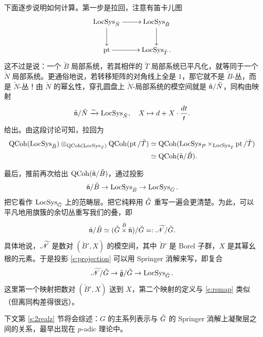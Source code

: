 	  下面逐步说明如何计算。第一步是拉回，注意有笛卡儿图
	  \[
	  \xymatrix{ \on{LocSys}_{\check{N}} \ar[r] \ar[d] &
	  \on{LocSys}_{\check{B}} \ar[d] \\ \on{pt} \ar[r] &
	  \on{LocSys}_{\check{T}}.}
	  \]
	  这不过是说：一个 $\check{B}$ 局部系统，若其相伴的 $\check{T}$ 局部系统已平凡化，就等同于一个 $\check{N}$ 局部系统。更通俗地说，若转移矩阵的对角线上全是 $1$，那它就不是 $\check{B}$-丛，而是 $\check{N}$-丛！由 $\check{N}$ 的幂幺性，穿孔圆盘上 $\check{N}$-局部系统的模空间就是 $\check{\mathfrak{n}} / \check{N}$，同构由映射
	  \begin{equation} \label{e:rsmap}
	    \check{\mathfrak{n}} / \check{N} \xrightarrow{\sim}
	    \operatorname{LocSys}_{\check{N}},
	    \quad  X \mapsto d +
	    X \cdot
	    \frac{dt}{t}.
	  \end{equation}
	 给出。由这段讨论可知，拉回为
	 \begin{equation}
	 \begin{split}
	 \operatorname{QCoh}(\operatorname{LocSys}_{\check{B}}) \otimes_{\operatorname{QCoh}(\operatorname{LocSys}_{\check{T}})}
	 \operatorname{QCoh}(\operatorname{pt}/\check{T}) &\simeq \operatorname{QCoh}( \operatorname{LocSys}_{P}  \times_{
	 \operatorname{LocSys}_{\check{T}}} \operatorname{pt}/\check{T}  ) \\
	 &\simeq \operatorname{QCoh}(\check{\mathfrak{n}} / \check{B} ).
	 \end{split}
	 \end{equation}


最后，推前再次给出 $\operatorname{QCoh}(\check{\mathfrak{n}} / \check{B} )$，通过投影
%
\begin{equation} \label{e:projection}
	     \check{\mathfrak{n}} / \check{B} \rightarrow \operatorname{LocSys}_{\check{B}}
	     \rightarrow \operatorname{LocSys}_{\check{G}}.
\end{equation}
%
把它看作 $\operatorname{LocSys}_{\check{G}}$ 上的范畴层。把它纯粹用 $\check{G}$ 重写一遍会更清楚。为此，可以平凡地用旗簇的余切丛重写我们的叠，即
%
\[
	      \check{\mathfrak{n}} / \check{B} \simeq (\check{G} \overset{ \check{B}}
	      \times \check{\mathfrak{n}}) / \check{G} =:
	      \widetilde{\mathscr{N}} / \check{G}.
\]
%
具体地说，$\widetilde{\mathscr{N}}$ 是数对 $({\check{B}}', X)$ 的模空间，其中 ${\check{B}}'$ 是 Borel 子群，$X$ 是其幂幺根的元素。于是投影 \eqref{e:projection} 可以用 Springer 消解来写，即复合
%
\[
	    \widetilde{\mathscr{N}}/ \check{G} \rightarrow \check{\mathfrak{g}} / \check{G} \rightarrow \operatorname{LocSys}_{\check{G}}.
\]
%
这里第一个映射把数对 $(\check{B}', X)$ 送到 $X$，第二个映射的定义与 \eqref{e:rsmap} 类似（但离同构差得很远）。




\begin{re} 下文第 \ref{s:2realz} 节将会综述：$G$ 的主系列表示与 $\check{G}$ 的 Springer 消解上凝聚层之间的关系，最早出现在 $p$-adic 理论中。
\end{re}



